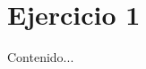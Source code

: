 \documentclass[chaptersright]{informeitsv}
\begin{document}
\maketitle

\tableofcontents
\setcounter{page}{1}
\thispagestyle{plain}

\chapter{Ejercicio 1}
Contenido...
\end{document}
